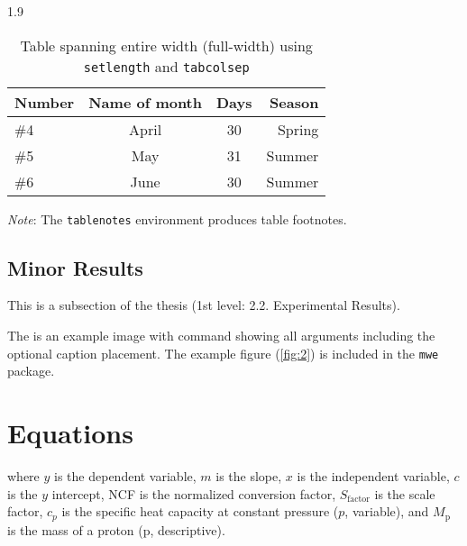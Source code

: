 \documentclass[ms-thesis,12pt,mathdesign]{ndsu-thesis-2022}
\newcommand\myspacing{1.9} %
\begin{document}
\begin{spacing}{\myspacing}
\begin{table}[ht]
\centering
\caption{Table spanning entire width (full-width) using \texttt{setlength} and
\texttt{tabcolsep}}
\vspace{-1ex}
\setlength{\tabcolsep}{3.75em}
\begin{tabular}{@{\hspace{2ex}} lccr @{\hspace{2ex}}}
\toprule
Number & Name of month & Days & Season\\
\midrule
\#4 	& April  & 30		& Spring\\
\#5 	& May    & 31		& Summer\\
\#6 	& June   & 30		& Summer\\
\bottomrule
\end{tabular}
\begin{tablenotes}[flushleft]
\footnotesize
\item \hspace{-1ex} \emph{Note}: The \texttt{tablenotes} environment produces table footnotes. 
\end{tablenotes}
\label{tab:2}
\end{table}	\kant[7-8]

\subsection{Minor Results}
This is a subsection of the thesis (1st level: 2.2. Experimental Results). 	

\kant[8]
The  is an example image with command showing all arguments including the optional caption placement. The example figure (\cref{fig:2}) is included in the \texttt{mwe} package.

\kant[8]

\section{Equations}
\kant[2]


\noindent where $y$ is the dependent variable, $m$ is the slope, $x$ is the independent variable, $c$ is the $y$ intercept, NCF is the normalized conversion factor, $S_\text{factor}$ is the scale factor, $c_p$ is the specific heat capacity at constant pressure ($p$, variable), and $M_\text{p}$ is the mass of a proton (p, descriptive). 


\end{spacing}
\end{document}
